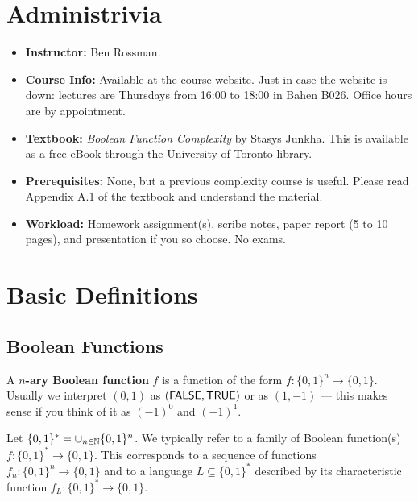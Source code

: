 \documentclass[11pt]{article}
\begin{document}
	\tableofcontents
	\newpage
	
	
	\section{Administrivia}
	\label{sec:admin}
	\begin{itemize}
		\item \textbf{Instructor:} Ben Rossman. 
		\item \textbf{Course Info:} Available at the \href{http://www.math.toronto.edu/rossman/CSC2429.html}{course website}. Just in case the website is down: lectures are Thursdays from 16:00 to 18:00 in Bahen B026. Office hours are by appointment.
		\item \textbf{Textbook:} \emph{Boolean Function Complexity} by Stasys Junkha. This is available as a free eBook through the University of Toronto library. 
		\item \textbf{Prerequisites:} None, but a previous complexity course is useful. Please read Appendix A.1 of the textbook and understand the material.
		\item \textbf{Workload:} Homework assignment(s), scribe notes, paper report (5 to 10 pages), and presentation if you so choose. No exams.
	\end{itemize}
	
	\section{Basic Definitions}
	\subsection{Boolean Functions}
	\label{section:definitions}
	\begin{definition}
		A \textbf{$n$-ary Boolean function} $f$ is a function of the form $f: \{0,1\}^n \rightarrow \{0,1\}$. Usually we interpret $(0,1)$ as $(\operatorname*{\mathsf{FALSE}}, \operatorname*{\mathsf{TRUE}})$ or as $(1,-1)$ --- this makes sense if you think of it as $(-1)^0$ and $(-1)^{1}$.
	\end{definition}
	
	Let $\{0,1\}^* = \cup_{n \in \mathbb{N}} \{0,1\}^n$. We typically refer to a family of Boolean function(s) $f: \{0,1\}^* \rightarrow \{0,1\}$. This corresponds to a sequence of functions $f_n: \{0,1\}^n \rightarrow \{0,1\}$ and to a language $L \subseteq \{0, 1\}^*$ described by its characteristic function $f_L: \{0,1\}^* \rightarrow \{0,1\}$.
	
\end{document}
